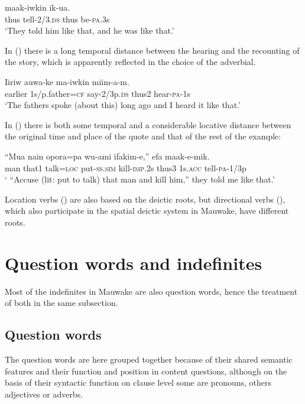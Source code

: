 \ea%
\label{ex:x702}
\gll {} maak-iwkin  ik-ua. \\
thus tell-2/3.\textsc{ds} thus be-\textsc{pa}.3s\\
\glt`They told him like that, and he was like that.'
\z

In () there is a long temporal distance between the hearing and the recounting of the story, which is apparently reflected in the choice of the adverbial.

\ea%
\label{ex:x1857}
\gll Iiriw auwa-ke ma-iwkin  miim-a-m. \\
earlier 1s/p.father=\textsc{cf} say-2/3p.\textsc{ds} thus2 hear-\textsc{pa}-1s\\
\glt`The fathers spoke (about this) long ago and I heard it like that.'
\z

In () there is both some temporal and a considerable locative distance between the original time and place of the quote and that of the rest of the example: 

\ea%
\label{ex:x1858}
\gll ``Mua nain opora=pa wu-ami ifakim-e,''  efa maak-e-mik.\\
man that1 talk=\textsc{loc} put-\textsc{ss}.\textsc{sim} kill-\textsc{imp}.2s thus3 1s.\textsc{acc} tell-\textsc{pa}-1/3p\\
\glt` ``Accuse (lit: put to talk) that man and kill him,'' they told me like that.'
\z

Location verbs () are also based on the deictic roots, but directional verbs (), which also participate in the spatial deictic system in Mauwake, have different roots. 

\section{Question words and indefinites}
{}
Most of the indefinites in Mauwake are also question words, hence the treatment of both in the same subsection.

\subsection{Question words}
{}
The question words are here grouped together because of their shared semantic features and their function and position in content questions, although on the basis of their syntactic function on clause level some are pronouns, others adjectives or adverbs. 

